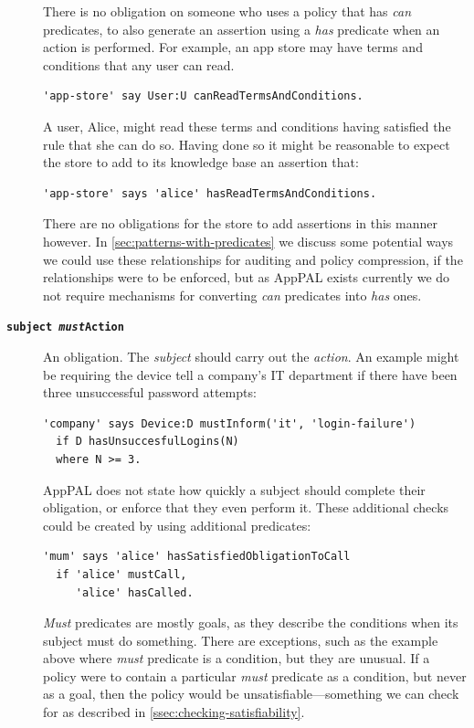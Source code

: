 \documentclass[thesis.tex]{subfiles}
\begin{document}
\begin{description}
  There is no obligation on someone who uses a policy that has \emph{can}
  predicates, to also generate an assertion using a \emph{has} predicate
  when an action is performed.  For example, an app store may have terms
  and conditions that any user can read.
  \begin{lstlisting}
'app-store' say User:U canReadTermsAndConditions.
\end{lstlisting}
A user, Alice, might read these terms and conditions having satisfied
the rule that she can do so.  Having done so it might be reasonable to
expect the store to add to its knowledge base an assertion that:
 \begin{lstlisting}
'app-store' says 'alice' hasReadTermsAndConditions.   
  \end{lstlisting}
  There are no obligations for the store to add assertions in this
  manner however.  In \autoref{sec:patterns-with-predicates} we discuss
  some potential ways we could use these relationships for auditing and
  policy compression, if the relationships were to be enforced, but as
  AppPAL exists currently we do not require mechanisms for converting
  \emph{can} predicates into \emph{has} ones.

\item[\bfseries\texttt{subject \emph{must}Action}]
  An obligation.  The \emph{subject} should carry out the \emph{action}.
  An example might be requiring the device tell a company's IT department if there have been three unsuccessful password attempts:

  \begin{minipage}{\linewidth}
  \begin{lstlisting}
'company' says Device:D mustInform('it', 'login-failure')
  if D hasUnsuccesfulLogins(N)
  where N >= 3.
  \end{lstlisting}
  \end{minipage}

  AppPAL does not state how quickly a subject should complete their obligation, or
  enforce that they even perform it.  These additional checks could be created
  by using additional predicates:

  \begin{lstlisting}
'mum' says 'alice' hasSatisfiedObligationToCall
  if 'alice' mustCall,
     'alice' hasCalled.
  \end{lstlisting}

  \emph{Must} predicates are mostly goals, as they describe the conditions when
  its subject must do something.  There are exceptions, such as the example
  above where \emph{must} predicate is a condition, but they are unusual.  If a policy were to contain a particular \emph{must} predicate as a condition, but never as a goal, then the policy would be unsatisfiable---something we can check for as described in \autoref{ssec:checking-satisfiability}.
\end{description}
\end{document}
